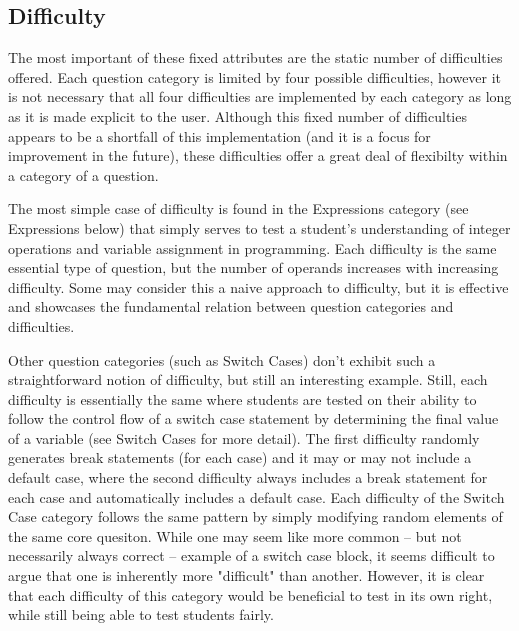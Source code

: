 \documentclass{article}
\begin{document}
\subsection{Difficulty}

The most important of these fixed attributes are the static number of difficulties offered. Each question category is
limited by four possible difficulties, however it is not necessary that all four difficulties are implemented by each category
as long as it is made explicit to the user. Although this fixed number of difficulties appears to be a shortfall of this
implementation (and it is a focus for improvement in the future), these difficulties offer a great deal of flexibilty
within a category of a question.

The most simple case of difficulty is found in the Expressions category (see Expressions below)
that simply serves to test a student's understanding of integer operations and variable assignment in programming.
Each difficulty is the same essential type of question, but the number of operands increases with increasing difficulty.
Some may consider this a naive approach to difficulty, but it is effective and showcases the fundamental relation
between question categories and difficulties.

Other question categories (such as Switch Cases) don't exhibit such a straightforward
notion of difficulty, but still an interesting example. Still, each difficulty is essentially the same where students are tested on their
ability to follow the control flow of a switch case statement by determining the final value of a variable (see Switch Cases for more detail).
The first difficulty randomly generates break statements (for each case) and it may or may not include a default case, where the second difficulty
always includes a break statement for each case and automatically includes a default case. Each difficulty of the Switch Case category follows the
same pattern by simply modifying random elements of the same core quesiton. While one may seem like more common -- but not necessarily always
correct -- example of a switch case block, it seems difficult to argue that one is inherently more "difficult" than another. However, it is clear
that each difficulty of this category would be beneficial to test in its own right, while still being able to test students fairly.
\end{document}
